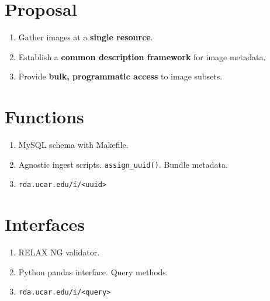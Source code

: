 \documentclass{beamer}
\begin{document}
\section{Proposal}
\begin{frame}
    \begin{enumerate}
        \item Gather images at a \textbf{single resource}.
        \item Establish a \textbf{common description framework} for image metadata.
        \item Provide \textbf{bulk, programmatic access} to image subsets.
    \end{enumerate}
\end{frame}

\section{Functions}

\begin{frame}
    \begin{enumerate}
        \item MySQL schema with Makefile.
        \item Agnostic ingest scripts. \texttt{assign\_uuid()}. Bundle metadata.
        \item \texttt{rda.ucar.edu/i/<uuid>}
    \end{enumerate}
\end{frame}

\section{Interfaces}
\begin{frame}
	\begin{enumerate}
        \item RELAX NG validator.

        \item Python pandas interface. Query methods.

        \item \texttt{rda.ucar.edu/i/<query>}
	\end{enumerate}
\end{frame}
\end{document}
